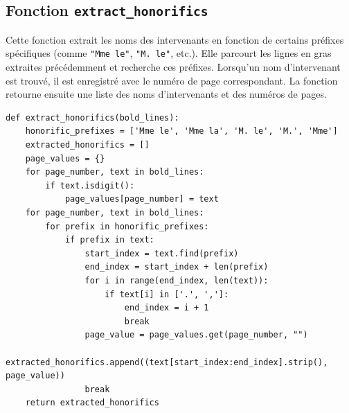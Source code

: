 \subsection{Fonction \texttt{extract\_honorifics}}
Cette fonction extrait les noms des intervenants en fonction de certains préfixes spécifiques (comme \texttt{"Mme le"}, \texttt{"M. le"}, etc.). Elle parcourt les lignes en gras extraites précédemment et recherche ces préfixes. 
Lorsqu'un nom d'intervenant est trouvé, il est enregistré avec le numéro de page correspondant. La fonction retourne ensuite une liste des noms d'intervenants et des numéros de pages.
\begin{lstlisting}
def extract_honorifics(bold_lines):
    honorific_prefixes = ['Mme le', 'Mme la', 'M. le', 'M.', 'Mme']
    extracted_honorifics = []
    page_values = {}
    for page_number, text in bold_lines:
        if text.isdigit():
            page_values[page_number] = text
    for page_number, text in bold_lines:
        for prefix in honorific_prefixes:
            if prefix in text:
                start_index = text.find(prefix)
                end_index = start_index + len(prefix) 
                for i in range(end_index, len(text)):
                    if text[i] in ['.', ',']:
                        end_index = i + 1
                        break
                page_value = page_values.get(page_number, "")
                extracted_honorifics.append((text[start_index:end_index].strip(), page_value))
                break
    return extracted_honorifics
\end{lstlisting}

\newpage
